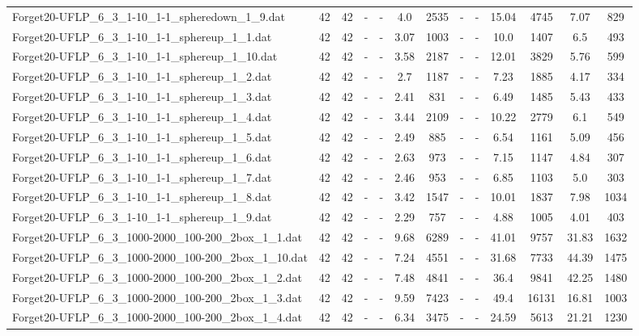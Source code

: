\begin{table}[!ht]
{\begin{tabular}{lcccccccccccc}
Forget20-UFLP\_6\_3\_1-10\_1-1\_spheredown\_1\_9.dat & 42 & 42 &  - &  - & 4.0 & 2535 &  - &  - & 15.04 & 4745 & 7.07 & 829 \\
Forget20-UFLP\_6\_3\_1-10\_1-1\_sphereup\_1\_1.dat & 42 & 42 &  - &  - & 3.07 & 1003 &  - &  - & 10.0 & 1407 & 6.5 & 493 \\
Forget20-UFLP\_6\_3\_1-10\_1-1\_sphereup\_1\_10.dat & 42 & 42 &  - &  - & 3.58 & 2187 &  - &  - & 12.01 & 3829 & 5.76 & 599 \\
Forget20-UFLP\_6\_3\_1-10\_1-1\_sphereup\_1\_2.dat & 42 & 42 &  - &  - & 2.7 & 1187 &  - &  - & 7.23 & 1885 & 4.17 & 334 \\
Forget20-UFLP\_6\_3\_1-10\_1-1\_sphereup\_1\_3.dat & 42 & 42 &  - &  - & 2.41 & 831 &  - &  - & 6.49 & 1485 & 5.43 & 433 \\
Forget20-UFLP\_6\_3\_1-10\_1-1\_sphereup\_1\_4.dat & 42 & 42 &  - &  - & 3.44 & 2109 &  - &  - & 10.22 & 2779 & 6.1 & 549 \\
Forget20-UFLP\_6\_3\_1-10\_1-1\_sphereup\_1\_5.dat & 42 & 42 &  - &  - & 2.49 & 885 &  - &  - & 6.54 & 1161 & 5.09 & 456 \\
Forget20-UFLP\_6\_3\_1-10\_1-1\_sphereup\_1\_6.dat & 42 & 42 &  - &  - & 2.63 & 973 &  - &  - & 7.15 & 1147 & 4.84 & 307 \\
Forget20-UFLP\_6\_3\_1-10\_1-1\_sphereup\_1\_7.dat & 42 & 42 &  - &  - & 2.46 & 953 &  - &  - & 6.85 & 1103 & 5.0 & 303 \\
Forget20-UFLP\_6\_3\_1-10\_1-1\_sphereup\_1\_8.dat & 42 & 42 &  - &  - & 3.42 & 1547 &  - &  - & 10.01 & 1837 & 7.98 & 1034 \\
Forget20-UFLP\_6\_3\_1-10\_1-1\_sphereup\_1\_9.dat & 42 & 42 &  - &  - & 2.29 & 757 &  - &  - & 4.88 & 1005 & 4.01 & 403 \\
Forget20-UFLP\_6\_3\_1000-2000\_100-200\_2box\_1\_1.dat & 42 & 42 &  - &  - & 9.68 & 6289 &  - &  - & 41.01 & 9757 & 31.83 & 1632 \\
Forget20-UFLP\_6\_3\_1000-2000\_100-200\_2box\_1\_10.dat & 42 & 42 &  - &  - & 7.24 & 4551 &  - &  - & 31.68 & 7733 & 44.39 & 1475 \\
Forget20-UFLP\_6\_3\_1000-2000\_100-200\_2box\_1\_2.dat & 42 & 42 &  - &  - & 7.48 & 4841 &  - &  - & 36.4 & 9841 & 42.25 & 1480 \\
Forget20-UFLP\_6\_3\_1000-2000\_100-200\_2box\_1\_3.dat & 42 & 42 &  - &  - & 9.59 & 7423 &  - &  - & 49.4 & 16131 & 16.81 & 1003 \\
Forget20-UFLP\_6\_3\_1000-2000\_100-200\_2box\_1\_4.dat & 42 & 42 &  - &  - & 6.34 & 3475 &  - &  - & 24.59 & 5613 & 21.21 & 1230 \\

\end{tabular}}
\end{table}
